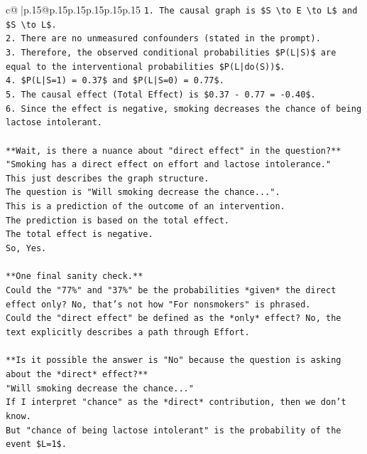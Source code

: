 \documentclass{article}
\begin{document}
{\begin{supertabular}{c@{$\;$}|p{.15\linewidth}@{}p{.15\linewidth}p{.15\linewidth}p{.15\linewidth}p{.15\linewidth}p{.15\linewidth}}
{{{\texttt{1.  The causal graph is \$S \textbackslash{}to E \textbackslash{}to L\$ and \$S \textbackslash{}to L\$.} \\
\texttt{2.  There are no unmeasured confounders (stated in the prompt).} \\
\texttt{3.  Therefore, the observed conditional probabilities \$P(L|S)\$ are equal to the interventional probabilities \$P(L|do(S))\$.} \\
\texttt{4.  \$P(L|S=1) = 0.37\$ and \$P(L|S=0) = 0.77\$.} \\
\texttt{5.  The causal effect (Total Effect) is \$0.37 {-} 0.77 = {-}0.40\$.} \\
\texttt{6.  Since the effect is negative, smoking decreases the chance of being lactose intolerant.} \\
\\ 
\texttt{**Wait, is there a nuance about "direct effect" in the question?**} \\
\texttt{"Smoking has a direct effect on effort and lactose intolerance."} \\
\texttt{This just describes the graph structure.} \\
\texttt{The question is "Will smoking decrease the chance...".} \\
\texttt{This is a prediction of the outcome of an intervention.} \\
\texttt{The prediction is based on the total effect.} \\
\texttt{The total effect is negative.} \\
\texttt{So, Yes.} \\
\\ 
\texttt{**One final sanity check.**} \\
\texttt{Could the "77\%" and "37\%" be the probabilities *given* the direct effect only? No, that's not how "For nonsmokers" is phrased.} \\
\texttt{Could the "direct effect" be defined as the *only* effect? No, the text explicitly describes a path through Effort.} \\
\\ 
\texttt{**Is it possible the answer is "No" because the question is asking about the *direct* effect?**} \\
\texttt{"Will smoking decrease the chance..."} \\
\texttt{If I interpret "chance" as the *direct* contribution, then we don't know.} \\
\texttt{But "chance of being lactose intolerant" is the probability of the event \$L=1\$.} \\
}}}
\end{supertabular}}
\end{document}
